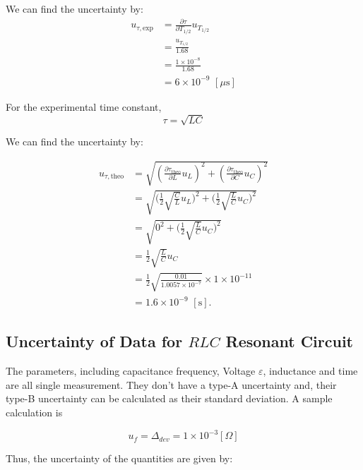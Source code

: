 \documentclass[a4paper]{article}
\begin{document}
We can find the uncertainty by:
\begin{align*}
	u_{\tau,\text{exp}}
	 & = \frac{\partial \tau}{\partial T_{1/2}}u_{T_{1/2}} \\
	 & = \frac{u_{T_{1/2}}}{1.68}                          \\
	 & = \frac{1\times 10^{-8}}{1.68}                      \\
	 & = 6\times 10^{-9}\,\,[\mu\text{s}]
\end{align*}

For the experimental time constant,
$$\tau = \sqrt{LC}$$

We can find the uncertainty by:

\begin{align*}
	u_{\tau,\text{theo}}
	 & = \sqrt{(\frac{\partial \tau_{\text{theo}}}{\partial L}u_L)^2 + (\frac{\partial \tau_{\text{theo}}}{\partial C}u_C)^2} \\
	 & = \sqrt{\bigg(\frac{1}{2}\sqrt{\frac{C}{L}}u_L\bigg)^2 + \bigg(\frac{1}{2}\sqrt{\frac{L}{C}}u_C\bigg)^2}               \\
	 & = \sqrt{0^2 + \bigg(\frac{1}{2}\sqrt{\frac{L}{C}}u_C\bigg)^2}                                                          \\
	 & = \frac{1}{2}\sqrt{\frac{L}{C}}u_C                                                                                     \\
	 & = \frac{1}{2}\sqrt{\frac{0.01}{1.0057\times10^{-7}}}\times 1 \times 10^{-11}                                           \\
	 & = 1.6\times 10^{-9}\,\,[\text{s}].
\end{align*}

\subsection{Uncertainty of Data for $RLC$ Resonant Circuit}

The parameters, including capacitance frequency, Voltage $\varepsilon$, inductance and time are all single measurement. They don't have a type-A uncertainty and, their type-B uncertainty can be calculated as their standard deviation. A sample calculation is

$$u_{f} = \Delta_{dev} = 1\times 10^{-3} [\Omega]$$

Thus, the uncertainty of the quantities are given by:
\end{document}
